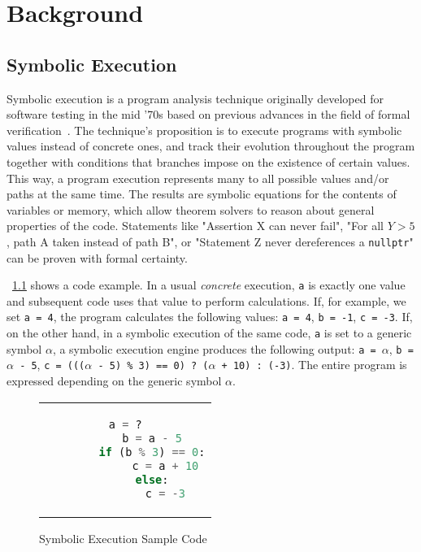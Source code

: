 \chapter{Background}

\section{Symbolic Execution}

Symbolic execution is a program analysis technique originally developed for software testing in the mid '70s based on
previous advances in the field of formal verification~\cite{Boyer1975Select, King1975Effigy, Howden1977Dissect}. The
technique's proposition is to execute programs with symbolic values instead of concrete ones, and track their evolution
throughout the program together with conditions that branches impose on the existence of certain values. This way, a
program execution represents many to all possible values and/or paths at the same time. The results are symbolic
equations for the contents of variables or memory, which allow theorem solvers to reason about general properties of the
code. Statements like "Assertion X can never fail", "For all $Y > 5$, path A taken instead of path B", or "Statement Z
never dereferences a \texttt{nullptr}" can be proven with formal certainty.

\lstlistingname~\ref{fig:symbexec_example_listing} shows a code example. In a usual \textit{concrete} execution,
\texttt{a} is exactly one value and subsequent code uses that value to perform calculations. If, for example, we set
\texttt{a = 4}, the program calculates the following values: \texttt{a = 4}, \texttt{b = -1}, \texttt{c = -3}. If, on
the other hand, in a symbolic execution of the same code, \texttt{a} is set to a generic symbol $\alpha$, a symbolic
execution engine produces the following output: \texttt{a = $\alpha$}, \texttt{b = $\alpha$ - 5}, \texttt{c =
((($\alpha$ - 5) \% 3) == 0) ? ($\alpha$ + 10) : (-3)}. The entire program is expressed depending on the generic symbol
$\alpha$.

\begin{figure}[htbp]
    \centering
    \begin{tabular}{c}
    \begin{lstlisting}[language=Python]
        a = ?
        b = a - 5
        if (b % 3) == 0:
            c = a + 10
        else:
            c = -3
    \end{lstlisting}
    \end{tabular}
    \caption[Symbolic execution example]{Symbolic Execution Sample Code}\label{fig:symbexec_example_listing}
\end{figure}

